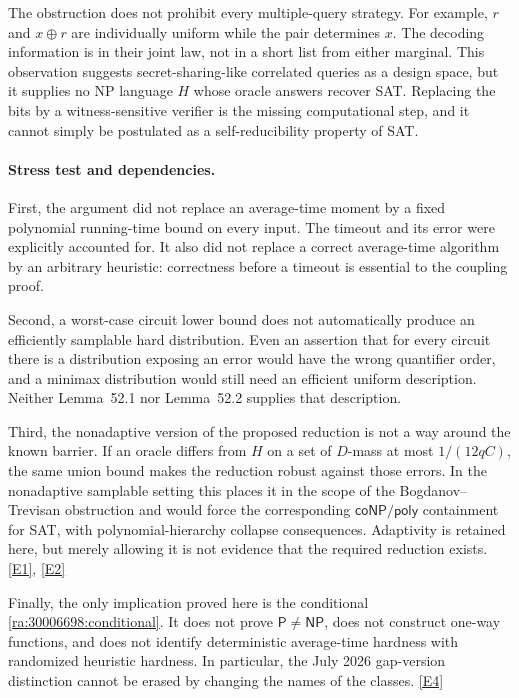 \documentclass[11pt]{article}
\newcommand{\eref}[2]{\hyperlink{extra:#1:#2}{[E#2]}}
\begin{document}
The obstruction does not prohibit every multiple-query strategy. For
example, $r$ and $x\mathbin{\oplus}r$ are individually uniform while the
pair determines $x$. The decoding information is in their joint law,
not in a short list from either marginal. This observation suggests
secret-sharing-like correlated queries as a design space, but it supplies
no NP language $H$ whose oracle answers recover SAT. Replacing the bits
by a witness-sensitive verifier is the missing computational step, and
it cannot simply be postulated as a self-reducibility property of SAT.

\paragraph{Stress test and dependencies.}
First, the argument did not replace an average-time moment by a fixed
polynomial running-time bound on every input. The timeout and its error
were explicitly accounted for. It also did not replace a correct
average-time algorithm by an arbitrary heuristic: correctness before a
timeout is essential to the coupling proof.

Second, a worst-case circuit lower bound does not automatically produce
an efficiently samplable hard distribution. Even an assertion that for
every circuit there is a distribution exposing an error would have the
wrong quantifier order, and a minimax distribution would still need an
efficient uniform description. Neither Lemma~52.1 nor Lemma~52.2 supplies
that description.

Third, the nonadaptive version of the proposed reduction is not a way
around the known barrier. If an oracle differs from $H$ on a set of
$D$-mass at most $1/(12qC)$, the same union bound makes the reduction
robust against those errors. In the nonadaptive samplable setting this
places it in the scope of the Bogdanov--Trevisan obstruction and would
force the corresponding $\mathsf{coNP/poly}$ containment for SAT, with
polynomial-hierarchy collapse consequences. Adaptivity is retained here,
but merely allowing it is not evidence that the required reduction exists.
\eref{30006698}{1}, \eref{30006698}{2}

Finally, the only implication proved here is the conditional
\eqref{ra:30006698:conditional}. It does not prove $\mathsf P\ne\mathsf{NP}$,
does not construct one-way functions, and does not identify deterministic
average-time hardness with randomized heuristic hardness. In particular,
the July 2026 gap-version distinction cannot be erased by changing the
names of the classes. \eref{30006698}{4}
\end{document}
